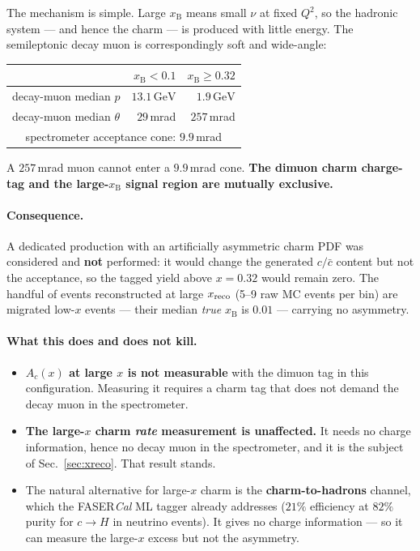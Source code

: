 \documentclass[11pt,a4paper]{article}
\newcommand{\xB}{x_{\mathrm{B}}}
\newcommand{\GeV}{\,\mathrm{GeV}}
\begin{document}
The mechanism is simple. Large $\xB$ means small $\nu$ at fixed $Q^2$, so the
hadronic system --- and hence the charm --- is produced with little energy. The
semileptonic decay muon is correspondingly soft and wide-angle:
\begin{center}\small
\begin{tabular}{lrr}
\toprule
& $\xB<0.1$ & $\xB\geq0.32$ \\
\midrule
decay-muon median $p$ & $13.1\GeV$ & $1.9\GeV$ \\
decay-muon median $\theta$ & $29\,$mrad & $257\,$mrad \\
\midrule
\multicolumn{3}{c}{spectrometer acceptance cone: $9.9\,$mrad} \\
\bottomrule
\end{tabular}
\end{center}
A $257\,$mrad muon cannot enter a $9.9\,$mrad cone. \textbf{The dimuon charm
charge-tag and the large-$\xB$ signal region are mutually exclusive.}

\paragraph{Consequence.} A dedicated production with an artificially asymmetric
charm PDF was considered and \textbf{not} performed: it would change the
generated $c/\bar{c}$ content but not the acceptance, so the tagged yield above
$x=0.32$ would remain zero. The handful of events reconstructed at large
$x_{\rm reco}$ (5--9 raw MC events per bin) are migrated low-$x$ events --- their
median \emph{true} $\xB$ is $0.01$ --- carrying no asymmetry.

\paragraph{What this does and does not kill.}
\begin{itemize}
  \item \textbf{$A_c(x)$ at large $x$ is not measurable} with the dimuon tag in
        this configuration. Measuring it requires a charm tag that does not
        demand the decay muon in the spectrometer.
  \item \textbf{The large-$x$ charm \emph{rate} measurement is unaffected.} It
        needs no charge information, hence no decay muon in the spectrometer,
        and it is the subject of Sec.~\ref{sec:xreco}. That result stands.
  \item The natural alternative for large-$x$ charm is the
        \textbf{charm-to-hadrons} channel, which the FASER\emph{Cal} ML tagger
        already addresses ($21\%$ efficiency at $82\%$ purity for $c\to H$ in
        neutrino events). It gives no charge information --- so it can measure
        the large-$x$ excess but not the asymmetry.
\end{itemize}
\end{document}
